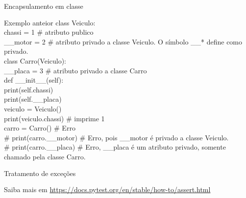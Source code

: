 \begin{frame}[t]{Encapsulamento em classe}
	
	\begin{block}{Exemplo anteior}		
		class Veiculo:\\
		\hspace{1em}chassi = 1 \# atributo publico\\
		\hspace{1em}\_\_motor = 2 \# atributo privado a classe Veiculo. O símbolo \_\_* define como privado.\\
		\vspace{0.5em}
		class Carro(Veiculo):\\
		\hspace{1em}\_\_placa = 3 \# atributo privado a classe Carro\\
		\vspace{0.5em}
		\hspace{1em}def \_\_init\_\_(self):\\
		\hspace{2em}print(self.chassi)\\
		\hspace{2em}print(self.\_\_placa)\\
		\vspace{0.5em}
		veiculo = Veiculo()\\
		print(veiculo.chassi) \# imprime 1\\
		\vspace{0.5em}
		carro = Carro() \# Erro\\
		\# print(carro.\_\_motor) \# Erro, pois \_\_motor é privado a classe Veiculo.\\
		\# print(carro.\_\_placa) \# Erro, \_\_placa é um atributo privado, somente chamado pela classe Carro.\\
	\end{block}
	
	
\end{frame}




\begin{frame}[t]{Tratamento de exceções}
	
	\fontsize{13pt}{15}\selectfont{
		
		O tratamento de exceção, na ciência da computação, é o mecanismo responsável pelo tratamento da ocorrência de condições que alteram o fluxo normal da execução de programas de computadores. \\Para condições consideradas parte do fluxo normal de execução, ver os conceitos de sinal e evento.
		
	}\par
	
	\vspace{2em}
	Saiba mais em
	\url{https://docs.pytest.org/en/stable/how-to/assert.html}
	
\end{frame}







